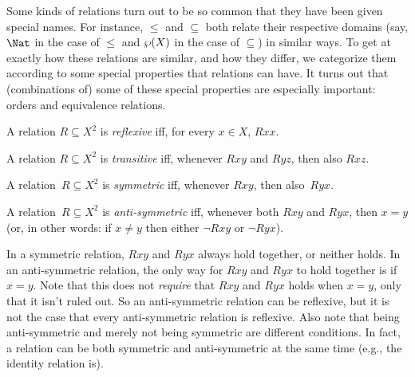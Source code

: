 \documentclass[../../../include/open-logic-section]{subfiles}
\begin{document}

\begin{intro}
Some kinds of relations turn out to be so common that they have been
given special names.  For instance, $\le$ and $\subseteq$ both relate
their respective domains (say, $\Nat$ in the case of $\le$ and
$\wp(X)$ in the case of $\subseteq$) in similar ways.  To get at
exactly how these relations are similar, and how they differ, we
categorize them according to some special properties that relations
can have.  It turns out that (combinations of) some of these special
properties are especially important: orders and equivalence relations.
\end{intro}

\begin{defn}[Reflexivity]
A relation $R \subseteq X^2$ is \emph{reflexive} iff, for every $x \in
X$, $Rxx$.
\end{defn}

\begin{defn}[Transitivity]
A relation $R \subseteq X^2$ is \emph{transitive} iff, whenever $Rxy$
and $Ryz$, then also $Rxz$.
\end{defn}

\begin{defn}[Symmetry]
A relation~$R \subseteq X^2$ is \emph{symmetric} iff, whenever
$Rxy$, then also~$Ryx$.
\end{defn}

\begin{defn}
A relation~$R \subseteq X^2$ is \emph{anti-symmetric} iff, whenever both
$Rxy$ and $Ryx$, then $x=y$ (or, in other words: if $x\neq y$ then
either $\lnot Rxy$ or $\lnot Ryx$).
\end{defn}

\begin{explain}
In a symmetric relation, $Rxy$ and $Ryx$ always hold together, or
neither holds.  In an anti-symmetric relation, the only way for $Rxy$
and $Ryx$ to hold together is if $x = y$.  Note that this does not
\emph{require} that $Rxy$ and $Ryx$ holds when $x = y$, only that it
isn't ruled out.  So an anti-symmetric relation can be reflexive, but
it is not the case that every anti-symmetric relation is
reflexive.  Also note that being anti-symmetric and merely not being
symmetric are different conditions.  In fact, a relation can be both
symmetric and anti-symmetric at the same time (e.g., the identity
relation is).
\end{explain}
\end{document}
